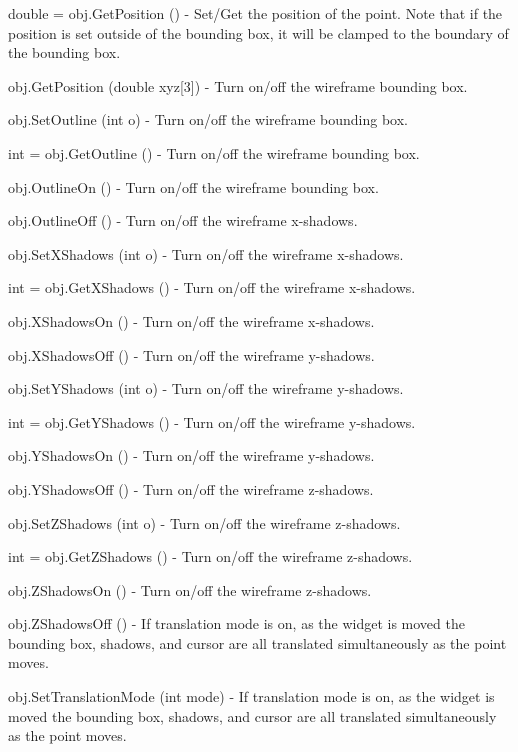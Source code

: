 \begin{DoxyItemize}
\item {\ttfamily double = obj.\-Get\-Position ()} -\/ Set/\-Get the position of the point. Note that if the position is set outside of the bounding box, it will be clamped to the boundary of the bounding box.  
\item {\ttfamily obj.\-Get\-Position (double xyz\mbox{[}3\mbox{]})} -\/ Turn on/off the wireframe bounding box.  
\item {\ttfamily obj.\-Set\-Outline (int o)} -\/ Turn on/off the wireframe bounding box.  
\item {\ttfamily int = obj.\-Get\-Outline ()} -\/ Turn on/off the wireframe bounding box.  
\item {\ttfamily obj.\-Outline\-On ()} -\/ Turn on/off the wireframe bounding box.  
\item {\ttfamily obj.\-Outline\-Off ()} -\/ Turn on/off the wireframe x-\/shadows.  
\item {\ttfamily obj.\-Set\-X\-Shadows (int o)} -\/ Turn on/off the wireframe x-\/shadows.  
\item {\ttfamily int = obj.\-Get\-X\-Shadows ()} -\/ Turn on/off the wireframe x-\/shadows.  
\item {\ttfamily obj.\-X\-Shadows\-On ()} -\/ Turn on/off the wireframe x-\/shadows.  
\item {\ttfamily obj.\-X\-Shadows\-Off ()} -\/ Turn on/off the wireframe y-\/shadows.  
\item {\ttfamily obj.\-Set\-Y\-Shadows (int o)} -\/ Turn on/off the wireframe y-\/shadows.  
\item {\ttfamily int = obj.\-Get\-Y\-Shadows ()} -\/ Turn on/off the wireframe y-\/shadows.  
\item {\ttfamily obj.\-Y\-Shadows\-On ()} -\/ Turn on/off the wireframe y-\/shadows.  
\item {\ttfamily obj.\-Y\-Shadows\-Off ()} -\/ Turn on/off the wireframe z-\/shadows.  
\item {\ttfamily obj.\-Set\-Z\-Shadows (int o)} -\/ Turn on/off the wireframe z-\/shadows.  
\item {\ttfamily int = obj.\-Get\-Z\-Shadows ()} -\/ Turn on/off the wireframe z-\/shadows.  
\item {\ttfamily obj.\-Z\-Shadows\-On ()} -\/ Turn on/off the wireframe z-\/shadows.  
\item {\ttfamily obj.\-Z\-Shadows\-Off ()} -\/ If translation mode is on, as the widget is moved the bounding box, shadows, and cursor are all translated simultaneously as the point moves.  
\item {\ttfamily obj.\-Set\-Translation\-Mode (int mode)} -\/ If translation mode is on, as the widget is moved the bounding box, shadows, and cursor are all translated simultaneously as the point moves.  

\end{DoxyItemize}
